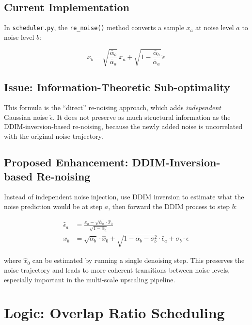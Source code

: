 \documentclass[11pt,a4paper]{article}
\newcommand{\file}[1]{\texttt{#1}}
\newcommand{\fn}[1]{\texttt{#1}}
\begin{document}
\subsection{Current Implementation}

In \file{scheduler.py}, the \fn{re\_noise()} method converts a sample $x_a$ at noise level $a$ to noise level $b$:

\begin{equation}
    x_b = \sqrt{\frac{\bar{\alpha}_b}{\bar{\alpha}_a}} \, x_a + \sqrt{1 - \frac{\bar{\alpha}_b}{\bar{\alpha}_a}} \, \tilde{\epsilon}
\end{equation}

\subsection{Issue: Information-Theoretic Sub-optimality}

This formula is the ``direct'' re-noising approach, which adds \emph{independent} Gaussian noise $\tilde{\epsilon}$.
It does not preserve as much structural information as the DDIM-inversion-based re-noising, because the newly added noise is uncorrelated with the original noise trajectory.

\subsection{Proposed Enhancement: DDIM-Inversion-based Re-noising}

Instead of independent noise injection, use DDIM inversion to estimate what the noise prediction would be at step $a$, then forward the DDIM process to step $b$:

\begin{align}
    \hat{\epsilon}_a &= \frac{x_a - \sqrt{\bar{\alpha}_a} \cdot \hat{x}_0}{\sqrt{1 - \bar{\alpha}_a}} \\
    x_b &= \sqrt{\bar{\alpha}_b} \cdot \hat{x}_0 + \sqrt{1 - \bar{\alpha}_b - \sigma_b^2} \cdot \hat{\epsilon}_a + \sigma_b \cdot \epsilon
\end{align}

where $\hat{x}_0$ can be estimated by running a single denoising step.
This preserves the noise trajectory and leads to more coherent transitions between noise levels, especially important in the multi-scale upscaling pipeline.

\section{Logic: Overlap Ratio Scheduling}
\end{document}
